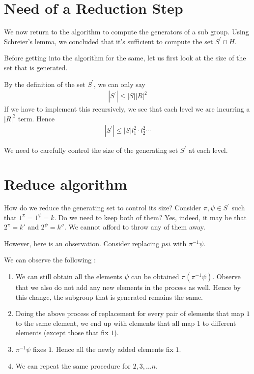 \section{Need of a Reduction Step}

We now return to the algorithm to compute the generators of a sub group. Using Schreier's lemma, we concluded that it's sufficient to compute the set $S^\prime \cap H$. 

Before getting into the algorithm for the same, let us first
look at the size of the set that is generated. 

By the definition of the set $S^\prime$, we can only say
\begin{align}
|S^{\prime}| \leq |S| |R|^2 
\end{align}
If we have to implement this recursively, we see
that each level we are incurring a $|R|^2$ term. 
Hence 
\begin{align}
|S^{\prime}| \leq |S| l_1^2 \cdot l_2^2 \cdots 
\end{align}

We need to carefully control the size of the generating
set $S^\prime$ at each level.

\section{{\sc Reduce} algorithm}

How do we reduce the generating set to control its size? Consider $\pi, \psi \in S^\prime$ such that $1^\pi = 1^\psi = k$. Do we need to keep both of them? Yes, indeed, it may be that $2^\pi = k'$ and $2^\psi = k''$. We cannot afford to throw any of them away. 

However, here is an observation. Consider replacing $psi$ with 
$\pi^{-1} \psi$.

We can observe the following : 
\begin{enumerate}
\item We can still obtain all the elements $\psi$ can be obtained $\pi(\pi^{-1} \psi)$. Observe that we also do not add any new elements 
in the process as well. Hence by this change, the subgroup that is generated remains the same.
\item Doing the above process of replacement for every pair of elements that map $1$ to the same element, we end up with elements that all map $1$ to different elements (except those that fix $1$).
\item $\pi^{-1}\psi$ fixes $1$. Hence all the newly added elements fix $1$.
\item We can repeat the same procedure for $2,3,\ldots n$.
\end{enumerate}

